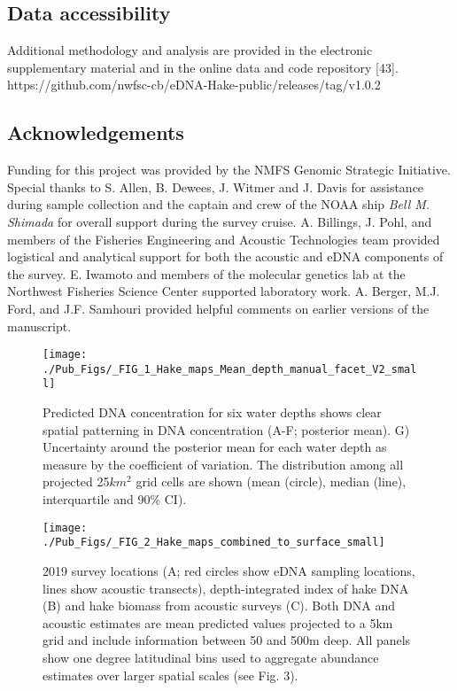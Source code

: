 \documentclass[
]{article}
\begin{document}
\hypertarget{Data accessibility}{%
\subsection{Data accessibility}\label{Data}}
Additional methodology and analysis are provided in
the electronic supplementary material and in the online data and code repository {[}43{]}.
https://github.com/nwfsc-cb/eDNA-Hake-public/releases/tag/v1.0.2

\hypertarget{acknowledgements}{%
\subsection{Acknowledgements}\label{acknowledgements}}

Funding for this project was provided by the NMFS Genomic Strategic
Initiative. Special thanks to S. Allen, B. Dewees, J. Witmer and J.
Davis for assistance during sample collection and the captain and crew
of the NOAA ship \emph{Bell M. Shimada} for overall support during the
survey cruise. A. Billings, J. Pohl, and members of the 
Fisheries Engineering and Acoustic Technologies team provided 
logistical and analytical support for both the acoustic and eDNA components 
of the survey. E. Iwamoto and members of the
molecular genetics lab at the Northwest Fisheries Science Center
supported laboratory work. A. Berger, M.J. Ford, and J.F. Samhouri provided helpful comments on
earlier versions of the manuscript. 



\newpage
\clearpage

\begin{figure}
\texttt{[image: ./Pub\_Figs/\_FIG\_1\_Hake\_maps\_Mean\_depth\_manual\_facet\_V2\_small]} \caption{\label{fig:mean.maps} Predicted DNA concentration for six water depths shows clear spatial patterning in DNA concentration (A-F; posterior mean). G) Uncertainty around the posterior mean for each water depth as measure by the coefficient of variation. The distribution among all projected 25$km^2$ grid cells are shown (mean (circle), median (line), interquartile and 90\% CI).}\label{fig:fig.mean.maps}
\end{figure}

\begin{figure}
\texttt{[image: ./Pub\_Figs/\_FIG\_2\_Hake\_maps\_combined\_to\_surface\_small]} \caption{\label{fig:surface.compare} 2019 survey locations (A; red circles show eDNA sampling locations, lines show acoustic transects), depth-integrated  index of hake DNA (B) and hake biomass from acoustic surveys (C).  Both DNA and acoustic estimates are mean predicted values projected to a 5km grid and include information between 50 and 500m deep. All panels show one degree latitudinal bins used to aggregate abundance estimates over larger spatial scales (see Fig. 3).    }\label{fig:fig.surface.compare}
\end{figure}
\end{document}
